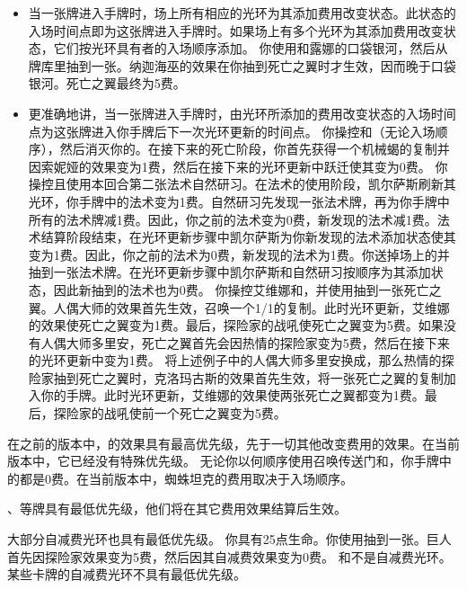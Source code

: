 \begin{itemize}
    \item 当一张牌进入手牌时，场上所有相应的光环为其添加费用改变状态。此状态的入场时间点即为这张牌进入手牌时。如果场上有多个光环为其添加费用改变状态，它们按光环具有者的入场顺序添加。
        \example 你使用和露娜的口袋银河，然后从牌库里抽到一张。纳迦海巫的效果在你抽到死亡之翼时才生效，因而晚于口袋银河。死亡之翼最终为5费。
    \item 更准确地讲，当一张牌进入手牌时，由光环所添加的费用改变状态的入场时间点为这张牌进入你手牌后下一次光环更新的时间点。
        \example 你操控和（无论入场顺序），然后消灭你的。在接下来的死亡阶段，你首先获得一个机械蝎的复制并因索妮娅的效果变为1费，然后在接下来的光环更新中跃迁使其变为0费。
        \example 你操控且使用本回合第二张法术自然研习。在法术的使用阶段，凯尔萨斯刷新其光环，你手牌中的法术变为1费。自然研习先发现一张法术牌，再为你手牌中所有的法术牌减1费。因此，你之前的法术变为0费，新发现的法术减1费。法术结算阶段结束，在光环更新步骤中凯尔萨斯为你新发现的法术添加状态使其变为1费。因此，你之前的法术为0费，新发现的法术为1费。你送掉场上的并抽到一张法术牌。在光环更新步骤中凯尔萨斯和自然研习按顺序为其添加状态，因此新抽到的法术也为0费。
        \example 你操控艾维娜和，并使用抽到一张死亡之翼。人偶大师的效果首先生效，召唤一个1/1的复制。此时光环更新，艾维娜的效果使死亡之翼变为1费。最后，探险家的战吼使死亡之翼变为5费。如果没有人偶大师多里安，死亡之翼首先会因热情的探险家变为5费，然后在接下来的光环更新中变为1费。
        \example 将上述例子中的人偶大师多里安换成，那么热情的探险家抽到死亡之翼时，克洛玛古斯的效果首先生效，将一张死亡之翼的复制加入你的手牌。此时光环更新，艾维娜的效果使两张死亡之翼都变为1费。最后，探险家的战吼使前一个死亡之翼变为5费。
\end{itemize}

在之前的版本中，的效果具有最高优先级，先于一切其他改变费用的效果。在当前版本中，它已经没有特殊优先级。
\example 无论你以何顺序使用召唤传送门和，你手牌中的都是0费。在当前版本中，蜘蛛坦克的费用取决于入场顺序。

、等牌具有最低优先级，他们将在其它费用效果结算后生效。

大部分自减费光环也具有最低优先级。
\example 你具有25点生命。你使用抽到一张。巨人首先因探险家效果变为5费，然后因其自减费效果变为0费。
\notice {}和不是自减费光环。
\exception 某些卡牌的自减费光环不具有最低优先级。

